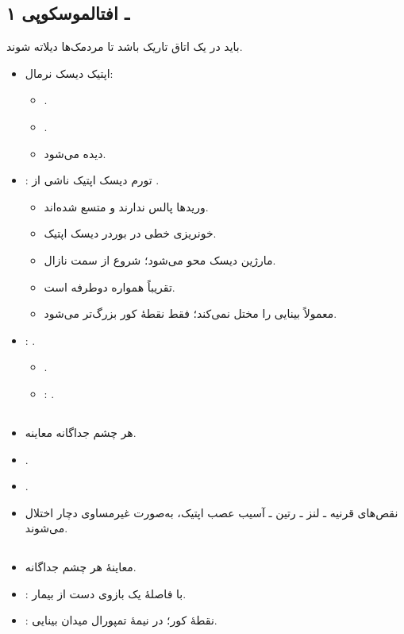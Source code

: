 \documentclass[a4paper,12pt]{extbook}
\begin{document}
\subsection*{۱ ـ افتالموسکوپی}
باید در یک اتاق تاریک باشد تا مردمک‌ها دیلاته شوند.
\begin{itemize}
\item اپتیک دیسک نرمال:
  \begin{itemize}
  \item {}.
  \item {}.
  \item {} دیده می‌شود.
  \end{itemize}
\item {}: تورم دیسک اپتیک ناشی از .
  \begin{itemize}
  \item وریدها پالس ندارند و متسع شده‌اند.
  \item خونریزی خطی در بوردر دیسک اپتیک.
  \item مارژین دیسک محو می‌شود؛ شروع از سمت نازال.
  \item تقریباً همواره دوطرفه است.
  \item معمولاً بینایی را مختل نمی‌کند؛ فقط نقطهٔ کور بزرگ‌تر می‌شود.
  \end{itemize}
\item {}: .
  \begin{itemize}
  \item {}.
  \item {}: .
  \end{itemize}
\end{itemize}
\subsection*{}
\begin{itemize}
\item هر چشم جداگانه معاینه.
\item {}.
\item {}.
\item نقص‌های قرنیه ـ لنز ـ رتین ـ آسیب عصب اپتیک، به‌صورت غیرمساوی دچار اختلال می‌شوند.
\end{itemize}
\subsection*{}
\begin{itemize}
\item معاینهٔ هر چشم جداگانه.
\item {}: با فاصلهٔ یک بازوی دست از بیمار.
\item {}: نقطهٔ کور؛ در نیمهٔ تمپورال میدان بینایی.
\end{itemize}
\end{document}
